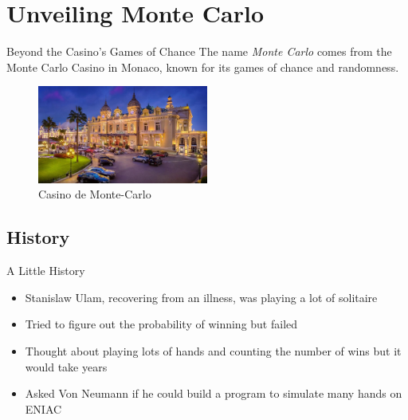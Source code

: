 \documentclass{beamer}
\begin{document}
    \section{Unveiling Monte Carlo}
    \begin{frame}{Beyond the Casino's Games of Chance}
    \vspace{2em}
    The name \textit{Monte Carlo} comes from the Monte Carlo Casino in Monaco, known for its games of chance and randomness.
        \begin{figure}
            \centering
            \includegraphics[width=0.5\textwidth]{figures/casino.jpg}
            \caption{Casino de Monte-Carlo}
            \label{fig:casino}
        \end{figure}
    \end{frame}

    \subsection{History}
    \begin{frame}{A Little History}
        \begin{itemize}
            \item Stanislaw Ulam, recovering from an illness, was playing a lot of solitaire
            \item Tried to figure out the probability of winning but failed
            \item Thought about playing lots of hands and counting the number of wins but it would take years
            \item Asked Von Neumann if he could build a program to simulate many hands on ENIAC
        \end{itemize}
    \end{frame}
\end{document}
